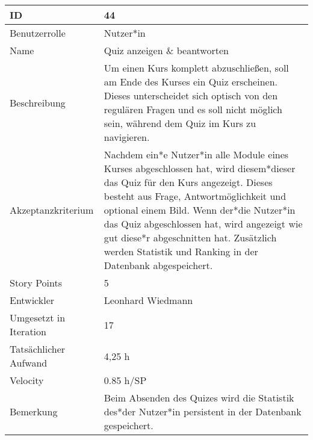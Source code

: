 \begin{tabularx}{\textwidth}{|p{}|X|}
	\hline
	ID & 44\\
	\hline
	Benutzerrolle & Nutzer*in\\
	\hline
	Name & Quiz anzeigen \& beantworten\\
	\hline
	Beschreibung & Um einen Kurs komplett abzuschließen, soll am Ende des Kurses ein Quiz erscheinen. Dieses unterscheidet sich optisch von den regulären Fragen und es soll nicht möglich sein, während dem Quiz im Kurs zu navigieren.\\
	\hline
	Akzeptanzkriterium & Nachdem ein*e Nutzer*in alle Module eines Kurses abgeschlossen hat, wird diesem*dieser das Quiz für den Kurs angezeigt. Dieses besteht aus Frage, Antwortmöglichkeit und optional einem Bild. Wenn der*die Nutzer*in das Quiz abgeschlossen hat, wird angezeigt wie gut diese*r abgeschnitten hat. Zusätzlich werden Statistik und Ranking in der Datenbank abgespeichert. \\
	\hline
	Story Points & 5\\
	\hline
	Entwickler & Leonhard Wiedmann\\
	\hline
	Umgesetzt in Iteration & 17\\
	\hline
	Tatsächlicher Aufwand & 4,25 h\\
	\hline
	Velocity & 0.85 h/SP\\
	\hline
	Bemerkung & Beim Absenden des Quizes wird die Statistik des*der Nutzer*in persistent in der Datenbank gespeichert.\\
	\hline
\end{tabularx}
\vspace{20pt}
